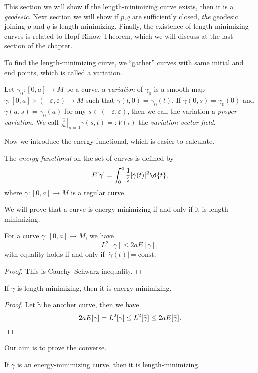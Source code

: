 This section we will show if the length-minimizing curve exists, then it is a \emph{geodesic}.
Next section we will show if $p,q$ are sufficiently closed, \emph{the} geodesic joining $p$ and $q$ is length-minimizing.
Finally, the existence of length-minimizing curves is related to Hopf-Rinow Theorem, which we will discuss at the last section of the chapter.

To find the length-minimizing curve, we ``gather'' curves with same initial and end points, which is called a variation.
\begin{defn}
    Let $\gamma_0:[0,a]\to M$ be a curve, a \emph{variation} of $\gamma_0$ is a smooth map $\gamma:[0,a]\times(-\varepsilon,\varepsilon)\to M$ such that $\gamma(t,0)=\gamma_0(t)$.
    If $\gamma(0,s)=\gamma_0(0)$ and $\gamma(a,s)=\gamma_0(a)$ for any $s\in(-\varepsilon,\varepsilon)$, then we call the variation a \emph{proper variation}.
    We call $\left.\frac{\partial{}}{\partial{s}}\right|_{s=0}\gamma(s,t)=:V(t)$ the \emph{variation vector field}.
\end{defn}

Now we introduce the energy functional, which is easier to calculate.
\begin{defn}
    The \emph{energy functional} on the set of curves is defined by
    \[E[\gamma]=\int_0^a\frac{1}{2}|\dot{\gamma}(t)|^2\d{t},\]
    where $\gamma:[0,a]\to M$ is a regular curve.
\end{defn}

We will prove that a curve is energy-minimizing if and only if it is length-minimizing.
\begin{lem}
    For a curve $\gamma:[0,a]\to M$, we have
    \[L^2[\gamma]\leq 2aE[\gamma],\]
    with equality holds if and only if $|\dot\gamma(t)|=\mathrm{const}$.
\end{lem}
\begin{proof}
    This is Cauchy--Schwarz inequality.
\end{proof}

\begin{prop}\label{length-min to energy-min}
    If $\gamma$ is length-minimizing, then it is energy-minimizing.
\end{prop}
\begin{proof}
    Let $\tilde\gamma$ be another curve, then we have
    \[2aE[\gamma]=L^2[\gamma]\leq L^2[\tilde\gamma]\leq 2aE[\tilde\gamma].\qedhere\]
\end{proof}

Our aim is to prove the converse.
\begin{prop}\label{energy-min to length-min}
    If $\gamma$ is an energy-minimizing curve, then it is length-minimizing.
\end{prop}

